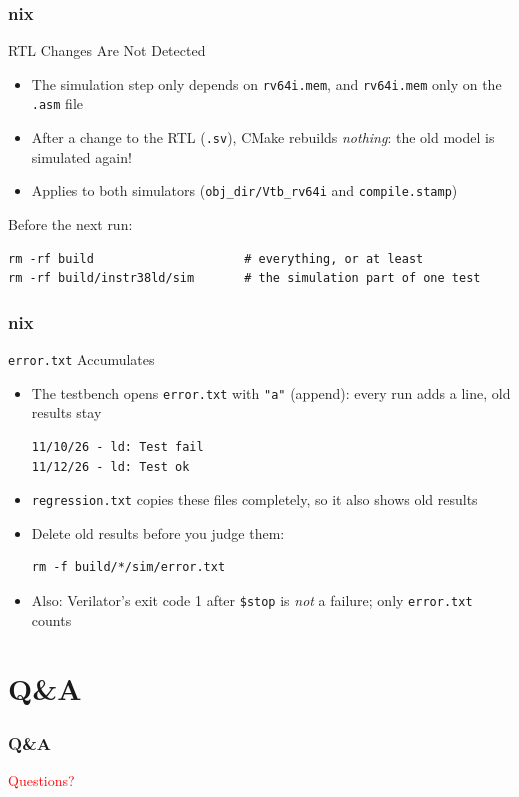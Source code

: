 \documentclass{beamer}
\newcommand{\astitle}{nix}
\newcommand{\assubtitle}{nix}
\newcommand{\cmd}[1]{\texttt{#1}}
\begin{document}
\renewcommand{\assubtitle}{RTL Changes Are Not Detected}
\begin{frame}[fragile]
\frametitle{\astitle}
\begin{block}{\assubtitle}
  \begin{itemize}
    \item The simulation step only depends on \cmd{rv64i.mem}, and \cmd{rv64i.mem}
      only on the \cmd{.asm} file
    \item After a change to the RTL (\cmd{.sv}), CMake rebuilds \emph{nothing}:
      the old model is simulated again!
    \item Applies to both simulators (\cmd{obj\_dir/Vtb\_rv64i} and \cmd{compile.stamp})
  \end{itemize}
  Before the next run:
\begin{lstlisting}[style=sh]
rm -rf build                     # everything, or at least
rm -rf build/instr38ld/sim       # the simulation part of one test
\end{lstlisting}
\end{block}
\end{frame}

\renewcommand{\assubtitle}{\texttt{error.txt} Accumulates}
\begin{frame}[fragile]
\frametitle{\astitle}
\begin{block}{\assubtitle}
  \begin{itemize}
    \item The testbench opens \cmd{error.txt} with \cmd{"a"} (append):
      every run adds a line, old results stay
\begin{lstlisting}
11/10/26 - ld: Test fail
11/12/26 - ld: Test ok
\end{lstlisting}
    \item \cmd{regression.txt} copies these files completely,
      so it also shows old results
    \item Delete old results before you judge them:
\begin{lstlisting}[style=sh]
rm -f build/*/sim/error.txt
\end{lstlisting}
    \item Also: Verilator's exit code 1 after \cmd{\$stop} is \emph{not} a failure;
      only \cmd{error.txt} counts
  \end{itemize}
\end{block}
\end{frame}

\section{Q\&A}
\renewcommand{\astitle}{Q\&A}
\begin{frame}
\frametitle{\astitle}
\vfill
\centering
\begin{Huge}\textcolor{red}{Questions?}\end{Huge}
\vfill
\end{frame}
\end{document}
